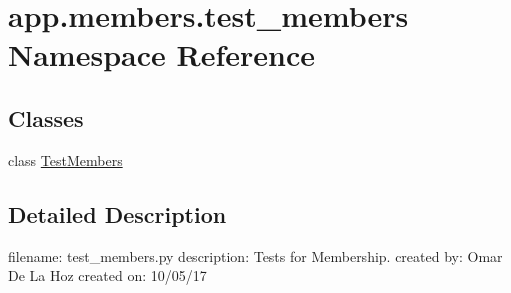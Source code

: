 \hypertarget{namespaceapp_1_1members_1_1test__members}{}\section{app.\+members.\+test\+\_\+members Namespace Reference}
\label{namespaceapp_1_1members_1_1test__members}
\subsection*{Classes}
\begin{DoxyCompactItemize}
\item 
class \mbox{\hyperlink{classapp_1_1members_1_1test__members_1_1_test_members}{Test\+Members}}
\end{DoxyCompactItemize}


\subsection{Detailed Description}
\begin{DoxyVerb}filename: test_members.py
description: Tests for Membership.
created by: Omar De La Hoz
created on: 10/05/17
\end{DoxyVerb}
 